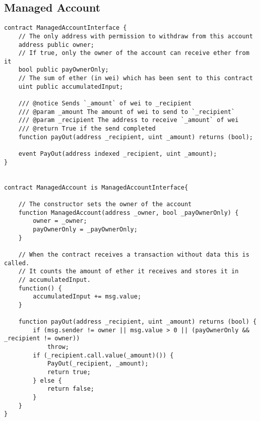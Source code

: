 \documentclass[9pt,oneside]{amsart}
\begin{document}
\begin{appendix}
\subsection{Managed Account}\label{app:ManagedAccount}
\begin{verbatim}
contract ManagedAccountInterface {
    // The only address with permission to withdraw from this account
    address public owner;
    // If true, only the owner of the account can receive ether from it
    bool public payOwnerOnly;
    // The sum of ether (in wei) which has been sent to this contract
    uint public accumulatedInput;

    /// @notice Sends `_amount` of wei to _recipient
    /// @param _amount The amount of wei to send to `_recipient`
    /// @param _recipient The address to receive `_amount` of wei
    /// @return True if the send completed
    function payOut(address _recipient, uint _amount) returns (bool);

    event PayOut(address indexed _recipient, uint _amount);
}


contract ManagedAccount is ManagedAccountInterface{

    // The constructor sets the owner of the account
    function ManagedAccount(address _owner, bool _payOwnerOnly) {
        owner = _owner;
        payOwnerOnly = _payOwnerOnly;
    }

    // When the contract receives a transaction without data this is called. 
    // It counts the amount of ether it receives and stores it in 
    // accumulatedInput.
    function() {
        accumulatedInput += msg.value;
    }

    function payOut(address _recipient, uint _amount) returns (bool) {
        if (msg.sender != owner || msg.value > 0 || (payOwnerOnly && _recipient != owner))
            throw;
        if (_recipient.call.value(_amount)()) {
            PayOut(_recipient, _amount);
            return true;
        } else {
            return false;
        }
    }
}

\end{verbatim}
\end{appendix}
\end{document}
